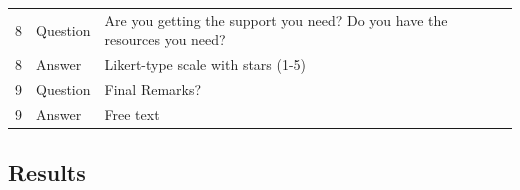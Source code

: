 \documentclass[paper=a4,justified,a4paper]{tufte-handout}
\begin{document}
\begin{longtable}[]{@{}lll@{}}
\begin{minipage}[t]{0.09\columnwidth}\raggedright
8\strut
\end{minipage} & \begin{minipage}[t]{0.14\columnwidth}\raggedright
Question\strut
\end{minipage} & \begin{minipage}[t]{0.68\columnwidth}\raggedright
Are you getting the support you need? Do you have the resources you
need?\strut
\end{minipage}\tabularnewline
\begin{minipage}[t]{0.09\columnwidth}\raggedright
8\strut
\end{minipage} & \begin{minipage}[t]{0.14\columnwidth}\raggedright
Answer\strut
\end{minipage} & \begin{minipage}[t]{0.68\columnwidth}\raggedright
Likert-type scale with stars (1-5)\strut
\end{minipage}\tabularnewline
\begin{minipage}[t]{0.09\columnwidth}\raggedright
9\strut
\end{minipage} & \begin{minipage}[t]{0.14\columnwidth}\raggedright
Question\strut
\end{minipage} & \begin{minipage}[t]{0.68\columnwidth}\raggedright
Final Remarks?\strut
\end{minipage}\tabularnewline
\begin{minipage}[t]{0.09\columnwidth}\raggedright
9\strut
\end{minipage} & \begin{minipage}[t]{0.14\columnwidth}\raggedright
Answer\strut
\end{minipage} & \begin{minipage}[t]{0.68\columnwidth}\raggedright
Free text\strut
\end{minipage}\tabularnewline
\bottomrule
\end{longtable}

\hypertarget{results}{%
\subsection{Results}\label{results}}
\end{document}
